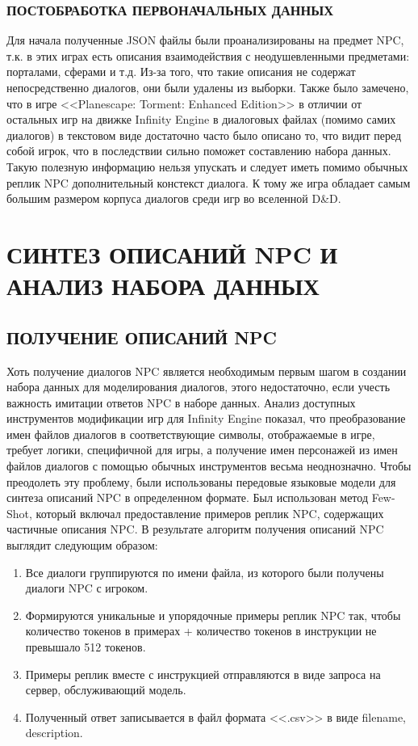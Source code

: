 \subsubsection{ПОСТОБРАБОТКА ПЕРВОНАЧАЛЬНЫХ ДАННЫХ}

Для начала полученные JSON файлы были проанализированы на предмет NPC, т.к. в этих играх есть описания взаимодействия с неодушевленными предметами: порталами, сферами и т.д. Из-за того, что такие описания не содержат непосредственно диалогов, они были удалены из выборки. Также было замечено, что в игре <<Planescape: Torment: Enhanced Edition>> в отличии от остальных игр на движке Infinity Engine в диалоговых файлах (помимо самих диалогов) в текстовом виде достаточно часто было описано то, что видит перед собой игрок, что в последствии сильно поможет составлению набора данных. Такую полезную информацию нельзя упускать и следует иметь помимо обычных реплик NPC дополнительный констекст диалога. К тому же игра обладает самым большим размером корпуса диалогов среди игр во вселенной D\&D.

\section{СИНТЕЗ ОПИСАНИЙ NPC И АНАЛИЗ НАБОРА ДАННЫХ}

\subsection{ПОЛУЧЕНИЕ ОПИСАНИЙ NPC}

Хоть получение диалогов NPC является необходимым первым шагом в создании набора данных для моделирования диалогов, этого недостаточно, если учесть важность имитации ответов NPC в наборе данных. Анализ доступных инструментов модификации игр для Infinity Engine показал, что преобразование имен файлов диалогов в соответствующие символы, отображаемые в игре, требует логики, специфичной для игры, а получение имен персонажей из имен файлов диалогов с помощью обычных инструментов весьма неоднозначно. Чтобы преодолеть эту проблему, были использованы передовые языковые модели для синтеза описаний NPC в определенном формате. Был использован метод Few-Shot, который включал предоставление примеров реплик NPC, содержащих частичные описания NPC. В результате алгоритм получения описаний NPC выглядит следующим образом:
\begin{enumerate}
      \item Все диалоги группируются по имени файла, из которого были получены диалоги NPC с игроком.
      \item Формируются уникальные и упорядочные примеры реплик NPC так, чтобы количество токенов в примерах + количество токенов в инструкции не превышало 512 токенов.
      \item Примеры реплик вместе с инструкцией отправляются в виде запроса на сервер, обслуживающий модель.
      \item Полученный ответ записывается в файл формата <<.csv>> в виде filename, description.
\end{enumerate}

